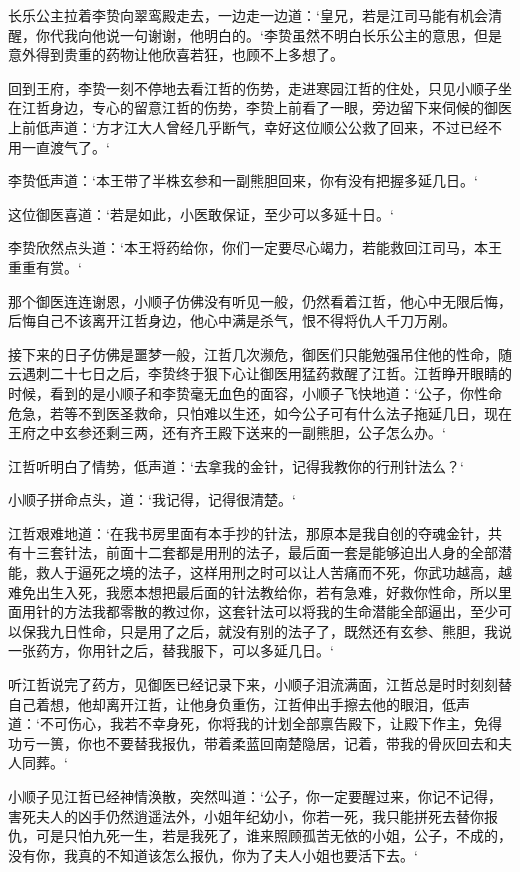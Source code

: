 长乐公主拉着李贽向翠鸾殿走去，一边走一边道：‘皇兄，若是江司马能有机会清醒，你代我向他说一句谢谢，他明白的。‘李贽虽然不明白长乐公主的意思，但是意外得到贵重的药物让他欣喜若狂，也顾不上多想了。

回到王府，李贽一刻不停地去看江哲的伤势，走进寒园江哲的住处，只见小顺子坐在江哲身边，专心的留意江哲的伤势，李贽上前看了一眼，旁边留下来伺候的御医上前低声道：‘方才江大人曾经几乎断气，幸好这位顺公公救了回来，不过已经不用一直渡气了。‘

李贽低声道：‘本王带了半株玄参和一副熊胆回来，你有没有把握多延几日。‘

这位御医喜道：‘若是如此，小医敢保证，至少可以多延十日。‘

李贽欣然点头道：‘本王将药给你，你们一定要尽心竭力，若能救回江司马，本王重重有赏。‘

那个御医连连谢恩，小顺子仿佛没有听见一般，仍然看着江哲，他心中无限后悔，后悔自己不该离开江哲身边，他心中满是杀气，恨不得将仇人千刀万剐。

接下来的日子仿佛是噩梦一般，江哲几次濒危，御医们只能勉强吊住他的性命，随云遇刺二十七日之后，李贽终于狠下心让御医用猛药救醒了江哲。江哲睁开眼睛的时候，看到的是小顺子和李贽毫无血色的面容，小顺子飞快地道：‘公子，你性命危急，若等不到医圣救命，只怕难以生还，如今公子可有什么法子拖延几日，现在王府之中玄参还剩三两，还有齐王殿下送来的一副熊胆，公子怎么办。‘

江哲听明白了情势，低声道：‘去拿我的金针，记得我教你的行刑针法么？‘

小顺子拼命点头，道：‘我记得，记得很清楚。‘

江哲艰难地道：‘在我书房里面有本手抄的针法，那原本是我自创的夺魂金针，共有十三套针法，前面十二套都是用刑的法子，最后面一套是能够迫出人身的全部潜能，救人于逼死之境的法子，这样用刑之时可以让人苦痛而不死，你武功越高，越难免出生入死，我愿本想把最后面的针法教给你，若有急难，好救你性命，所以里面用针的方法我都零散的教过你，这套针法可以将我的生命潜能全部逼出，至少可以保我九日性命，只是用了之后，就没有别的法子了，既然还有玄参、熊胆，我说一张药方，你用针之后，替我服下，可以多延几日。‘

听江哲说完了药方，见御医已经记录下来，小顺子泪流满面，江哲总是时时刻刻替自己着想，他却离开江哲，让他身负重伤，江哲伸出手擦去他的眼泪，低声道：‘不可伤心，我若不幸身死，你将我的计划全部禀告殿下，让殿下作主，免得功亏一篑，你也不要替我报仇，带着柔蓝回南楚隐居，记着，带我的骨灰回去和夫人同葬。‘

小顺子见江哲已经神情涣散，突然叫道：‘公子，你一定要醒过来，你记不记得，害死夫人的凶手仍然逍遥法外，小姐年纪幼小，你若一死，我只能拼死去替你报仇，可是只怕九死一生，若是我死了，谁来照顾孤苦无依的小姐，公子，不成的，没有你，我真的不知道该怎么报仇，你为了夫人小姐也要活下去。‘

